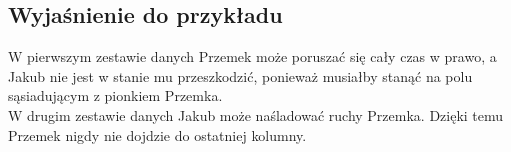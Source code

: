\documentclass[zad,zawodnik,utf8]{sinol}
\begin{document}
\begin{tasktext}
\makecompactexample

  \section{Wyjaśnienie do przykładu}
W pierwszym zestawie danych Przemek może poruszać się cały czas w prawo, a Jakub nie jest w stanie mu przeszkodzić, ponieważ musiałby
stanąć na polu sąsiadującym z pionkiem Przemka.
\\W drugim zestawie danych Jakub może naśladować ruchy Przemka. Dzięki temu Przemek nigdy nie dojdzie do ostatniej kolumny.

\end{tasktext}
\end{document}
